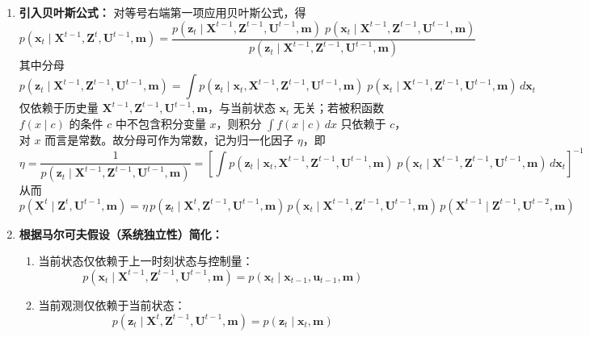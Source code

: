 \documentclass[../main.tex]{subfiles}
\begin{document}
\begin{enumerate}
{\begin{enumerate}
        \item \textbf{引入贝叶斯公式：}
        对等号右端第一项应用贝叶斯公式，得
$$
p(\mathbf{x}_t \mid \mathbf{X}^{t-1}, \mathbf{Z}^{t}, \mathbf{U}^{t-1}, \mathbf{m})
= \frac{
  p(\mathbf{z}_t \mid  \mathbf{X}^{t-1}, \mathbf{Z}^{t-1}, \mathbf{U}^{t-1}, \mathbf{m})
  \;
  p(\mathbf{x}_t \mid \mathbf{X}^{t-1}, \mathbf{Z}^{t-1}, \mathbf{U}^{t-1}, \mathbf{m})
}{
  p(\mathbf{z}_t \mid \mathbf{X}^{t-1}, \mathbf{Z}^{t-1}, \mathbf{U}^{t-1}, \mathbf{m})
}
$$
其中分母
$$
p(\mathbf{z}_t \mid \mathbf{X}^{t-1}, \mathbf{Z}^{t-1}, \mathbf{U}^{t-1}, \mathbf{m})
= \int 
  p(\mathbf{z}_t \mid \mathbf{x}_t, \mathbf{X}^{t-1}, \mathbf{Z}^{t-1}, \mathbf{U}^{t-1}, \mathbf{m})
  \;
  p(\mathbf{x}_t \mid \mathbf{X}^{t-1}, \mathbf{Z}^{t-1}, \mathbf{U}^{t-1}, \mathbf{m})
  \, d\mathbf{x}_t
$$
仅依赖于历史量 $\mathbf{X}^{t-1}, \mathbf{Z}^{t-1}, \mathbf{U}^{t-1}, \mathbf{m}$，与当前状态 $\mathbf{x}_t$ 无关；若被积函数 $f(x \mid c)$ 的条件 $c$ 中不包含积分变量 $x$，则积分 $\int f(x \mid c) \, dx$ 只依赖于 $c$，对 $x$ 而言是常数。故分母可作为常数，记为归一化因子 $\eta$，即
$$
\eta = \frac{1}{
  p(\mathbf{z}_t \mid \mathbf{X}^{t-1}, \mathbf{Z}^{t-1}, \mathbf{U}^{t-1}, \mathbf{m})
}
= \left[
  \int 
  p(\mathbf{z}_t \mid \mathbf{x}_t, \mathbf{X}^{t-1}, \mathbf{Z}^{t-1}, \mathbf{U}^{t-1}, \mathbf{m})
  \;
  p(\mathbf{x}_t \mid \mathbf{X}^{t-1}, \mathbf{Z}^{t-1}, \mathbf{U}^{t-1}, \mathbf{m})
  \, d\mathbf{x}_t
\right]^{-1}
$$
从而
        \[
        p(\mathbf{X}^{t} \mid \mathbf{Z}^{t}, \mathbf{U}^{t-1}, \mathbf{m})
        = \eta \, p(\mathbf{z}_t \mid \mathbf{X}^{t}, \mathbf{Z}^{t-1}, \mathbf{U}^{t-1}, \mathbf{m})
        \, p(\mathbf{x}_t \mid \mathbf{X}^{t-1}, \mathbf{Z}^{t-1}, \mathbf{U}^{t-1}, \mathbf{m})
        \, p(\mathbf{X}^{t-1} \mid \mathbf{Z}^{t-1}, \mathbf{U}^{t-2}, \mathbf{m})
        \]
        
        \item \textbf{根据马尔可夫假设（系统独立性）简化：}
        \begin{enumerate}
            \item 当前状态仅依赖于上一时刻状态与控制量：
            \[
            p(\mathbf{x}_t \mid \mathbf{X}^{t-1}, \mathbf{Z}^{t-1}, \mathbf{U}^{t-1}, \mathbf{m})
            = p(\mathbf{x}_t \mid \mathbf{x}_{t-1}, \mathbf{u}_{t-1}, \mathbf{m})
            \]
            \item 当前观测仅依赖于当前状态：
            \[
            p(\mathbf{z}_t \mid \mathbf{X}^{t}, \mathbf{Z}^{t-1}, \mathbf{U}^{t-1}, \mathbf{m})
            = p(\mathbf{z}_t \mid \mathbf{x}_t, \mathbf{m})
            \]
        \end{enumerate}
        

\end{enumerate}}
\end{enumerate}
\end{document}
